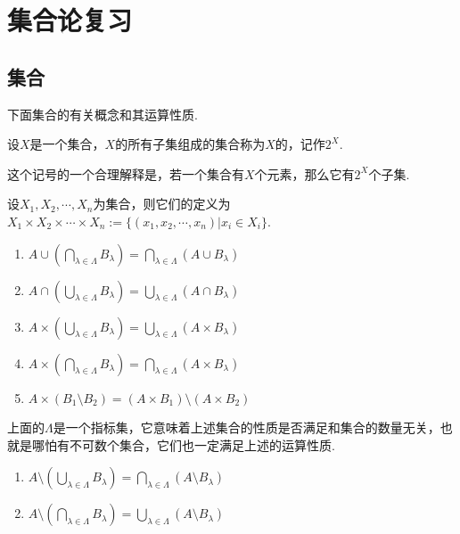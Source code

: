 \chapter{集合论复习}

\section{集合}

下面集合的有关概念和其运算性质.

\begin{definition}[幂集][def:1.1]
    设$X$是一个集合，$X$的所有子集组成的集合称为$X$的，记作$2^X$.
\end{definition}

这个记号的一个合理解释是，若一个集合有$X$个元素，那么它有$2^X$个子集.

\begin{definition}[集合的卡氏积][def:1.2]
    设$X_1,X_2,\cdots,X_n$为集合，则它们的定义为$X_1\times X_2\times\cdots\times X_n := \big\{(x_1,x_2,\cdots,x_n)|x_i\in X_i\big\}$.
\end{definition}

\begin{proposition}[集合运算的分配律][prop:1.1]
    \wideline
    \begin{enumerate}
        \item $A\cup \left(\bigcap_{\lambda\in\Lambda}B_\lambda\right)=\bigcap_{\lambda\in\Lambda}{\left(A\cup B_\lambda\right)}$
        \item $A\cap \left(\bigcup_{\lambda\in\Lambda}B_\lambda\right)=\bigcup_{\lambda\in\Lambda}{\left(A\cap B_\lambda\right)}$
        \item $A\times \left(\bigcup_{\lambda\in\Lambda}B_\lambda\right)=\bigcup_{\lambda\in\Lambda}{\left(A\times B_\lambda\right)}$
        \item $A\times \left(\bigcap_{\lambda\in\Lambda}B_\lambda\right)=\bigcap_{\lambda\in\Lambda}{\left(A\times B_\lambda\right)}$
        \item $A\times \left(B_1\setminus B_2\right)=(A\times B_1)\setminus (A\times B_2)$
    \end{enumerate}
\end{proposition}
上面的$\Lambda$是一个指标集，它意味着上述集合的性质是否满足和集合的数量无关，也就是哪怕有不可数个集合，它们也一定满足上述的运算性质.

\begin{theorem}[德摩根定律][thm:1.1]
    \wideline
    \begin{enumerate}
        \item $A\setminus \left(\bigcup_{\lambda\in\Lambda}{B_{\lambda}}\right)=\bigcap_{\lambda\in\Lambda}{\left(A\setminus B_{\lambda}\right)}$
        \item $A\setminus \left(\bigcap_{\lambda\in\Lambda}{B_{\lambda}}\right)=\bigcup_{\lambda\in\Lambda}{\left(A\setminus B_{\lambda}\right)}$
    \end{enumerate}
\end{theorem}

